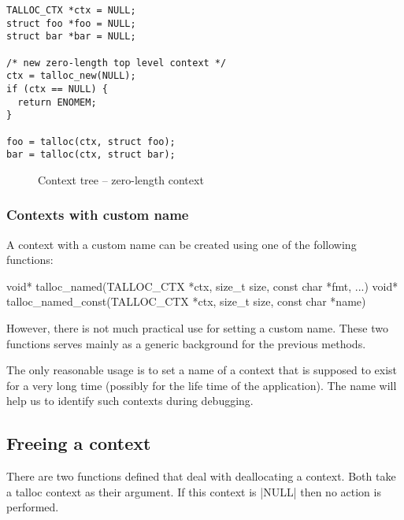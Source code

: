 \begin{lstlisting}[caption={talloc_new()},label=lst:talloc_new]
TALLOC_CTX *ctx = NULL;
struct foo *foo = NULL;
struct bar *bar = NULL;

/* new zero-length top level context */
ctx = talloc_new(NULL);
if (ctx == NULL) {
  return ENOMEM;
}

foo = talloc(ctx, struct foo);
bar = talloc(ctx, struct bar);
\end{lstlisting}

\begin{figure}[H]
  \centering
  
  \caption{Context tree -- zero-length context}
  \label{fig:context-tree-talloc-new}
\end{figure}

\subsubsection{Contexts with custom name}

A context with a custom name can be created using one of the following
functions:
\begin{funcproto}
void* talloc_named(TALLOC_CTX *ctx, size_t size,
                   const char *fmt, ...)
void* talloc_named_const(TALLOC_CTX *ctx, size_t size,
                         const char *name)
\end{funcproto}
\funclistend
However, there is not much practical use for setting a custom name. These two
functions serves mainly as a generic background for the previous methods.

The only reasonable usage is to set a name of a context that is supposed to
exist for a very long time (possibly for the life time of the application). The
name will help us to identify such contexts during debugging.

\subsection{Freeing a context}
\label{talloc:subsec:free-context}

There are two functions defined that deal with deallocating a context. Both
take a talloc context as their argument. If this context is |NULL| then no
action is performed.

